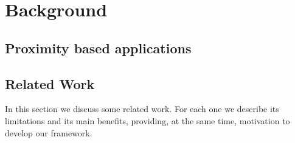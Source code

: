 
\chapter{Background}
\label{chapter:background}

\section{Proximity based applications}
\label{sec:background_proximity_based_applications}

\section{Related Work}
\label{sec:background_related_work}
In this section we discuss some related work.
For each one we describe its limitations and its main
benefits, providing, at the same time, motivation
to develop our framework.

